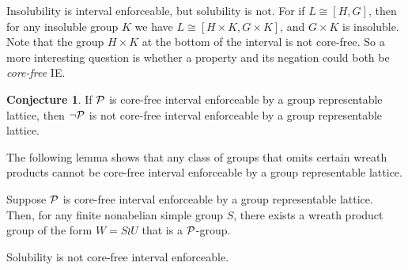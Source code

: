 \documentclass[xcolor=dvipsnames,11pt,hide notes]{beamer}
\newcommand{\IE}{{\small IE}}
\theoremstyle{definition}
\newcounter{conjecture}
\newtheorem{conjecture}[conjecture]{Conjecture}
\theoremstyle{remark}
\numberwithin{theorem}{section}
\numberwithin{claim}{section}
\numberwithin{equation}{section}
\numberwithin{conjecture}{section}
\begin{document}
\begin{frame}[label=IEPropsConjecture]{}
Insolubility is interval enforceable, but solubility is not. 
\vskip4mm
For if $L\cong [H, G]$, then for any insoluble 
group $K$ we have $L\cong [H\times K, G\times K]$, and $G\times K$ is
insoluble.  
\vskip4mm
Note that the group $H\times K$ at the bottom of
the interval is not core-free.  So a more interesting question is whether a
property and its negation could both be \emph{core-free} \IE.  
\vskip4mm
\begin{conjecture}
\label{conjecture:isle-prop2}
If $\mathcal{P}$ is core-free interval enforceable by a group representable lattice,
then $\neg \mathcal{P}$ is not core-free interval enforceable by a group representable lattice.
\end{conjecture}
\end{frame}

\begin{frame}[label=IEPropsLemma2]{}
The following lemma shows that 
any class of groups that omits certain wreath products cannot be core-free
interval enforceable by a group representable lattice. 
\vskip4mm
\begin{lemma}
Suppose $\mathcal{P}$ is core-free interval enforceable by a group
representable lattice.   
Then, for any finite nonabelian simple group $S$, there exists a wreath product group
of the form $W = S\wr U$ that is a $\mathcal{P}$-group. 
\end{lemma}
\vskip4mm
\begin{corollary}
Solubility is not core-free interval enforceable.
\end{corollary}
\end{frame}
\end{document}
